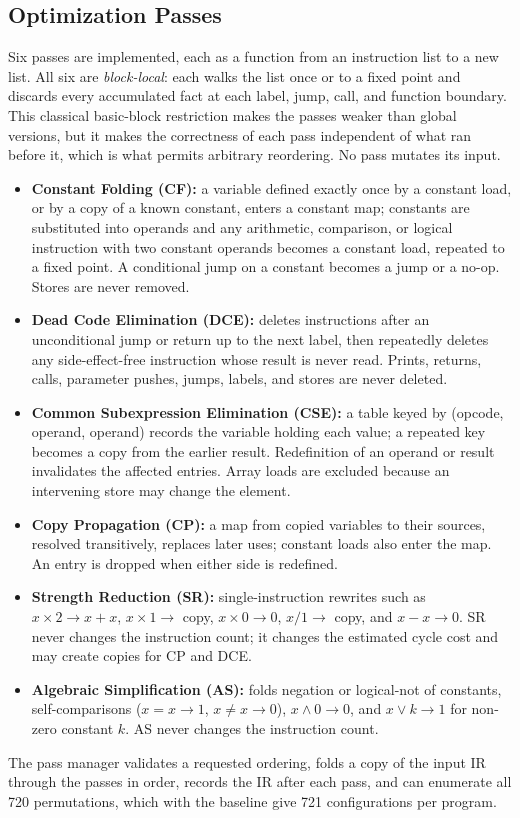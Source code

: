 \documentclass[conference]{IEEEtran}
\begin{document}
\subsection{Optimization Passes}
\label{sec:passes}
Six passes are implemented, each as a function from an instruction list to a new list. All six are \emph{block-local}: each walks the list once or to a fixed point and discards every accumulated fact at each label, jump, call, and function boundary. This classical basic-block restriction makes the passes weaker than global versions, but it makes the correctness of each pass independent of what ran before it, which is what permits arbitrary reordering. No pass mutates its input.
\begin{itemize}
    \item \textbf{Constant Folding (CF):} a variable defined exactly once by a constant load, or by a copy of a known constant, enters a constant map; constants are substituted into operands and any arithmetic, comparison, or logical instruction with two constant operands becomes a constant load, repeated to a fixed point. A conditional jump on a constant becomes a jump or a no-op. Stores are never removed.
    \item \textbf{Dead Code Elimination (DCE):} deletes instructions after an unconditional jump or return up to the next label, then repeatedly deletes any side-effect-free instruction whose result is never read. Prints, returns, calls, parameter pushes, jumps, labels, and stores are never deleted.
    \item \textbf{Common Subexpression Elimination (CSE):} a table keyed by (opcode, operand, operand) records the variable holding each value; a repeated key becomes a copy from the earlier result. Redefinition of an operand or result invalidates the affected entries. Array loads are excluded because an intervening store may change the element.
    \item \textbf{Copy Propagation (CP):} a map from copied variables to their sources, resolved transitively, replaces later uses; constant loads also enter the map. An entry is dropped when either side is redefined.
    \item \textbf{Strength Reduction (SR):} single-instruction rewrites such as $x \times 2 \to x + x$, $x \times 1 \to$ copy, $x \times 0 \to 0$, $x / 1 \to$ copy, and $x - x \to 0$. SR never changes the instruction count; it changes the estimated cycle cost and may create copies for CP and DCE.
    \item \textbf{Algebraic Simplification (AS):} folds negation or logical-not of constants, self-comparisons ($x = x \to 1$, $x \neq x \to 0$), $x \wedge 0 \to 0$, and $x \vee k \to 1$ for non-zero constant $k$. AS never changes the instruction count.
\end{itemize}
The pass manager validates a requested ordering, folds a copy of the input IR through the passes in order, records the IR after each pass, and can enumerate all 720 permutations, which with the baseline give 721 configurations per program.
\end{document}
